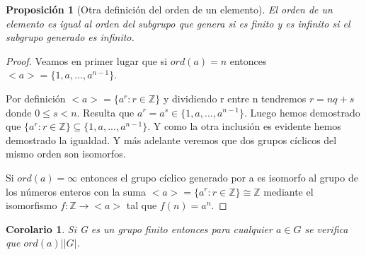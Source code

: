 \documentclass{article}
\theoremstyle{theorem-style}  %
\newtheorem{corollary}[theorem]{Corolario} %
\newtheorem{proposition}[theorem]{Proposición}
\theoremstyle{definition-style}
\theoremstyle{example-style}
\begin{document}
\begin{proposition}[Otra definición del orden de un elemento]
El orden de un elemento es igual al orden del subgrupo que genera si es finito y es infinito si el subgrupo generado es infinito.
\end{proposition}

\begin{proof}
Veamos en primer lugar que si $ord(a) = n$ entonces $<a> = \{1,a,...,a^{n-1}\}$.

Por definición $<a> = \{a^r:r \in \mathbb{Z}\}$ y dividiendo r entre n tendremos $r = nq + s$ donde $0 \le s < n$. Resulta que $a^r = a^s \in \{1,a,...,a^{n-1}\}$. Luego hemos demostrado que $\{a^r:r \in \mathbb{Z}\} \subseteq \{1,a,...,a^{n-1}\}$. Y como la otra inclusión es evidente hemos demostrado la igualdad. Y más adelante veremos que dos grupos cíclicos del mismo orden son isomorfos.

Si $ord(a) = \infty$ entonces el grupo cíclico generado por a es isomorfo al grupo de los números enteros con la suma $<a> = \{a^r:r \in \mathbb{Z}\} \cong \mathbb{Z}$ mediante el isomorfismo $f:\mathbb{Z} \rightarrow <a>$ tal que $f(n) = a^n$.
\end{proof}

\begin{corollary}
Si G es un grupo finito entonces para cualquier $a \in G$ se verifica que $ord(a) | |G|$.
\end{corollary}
\end{document}
